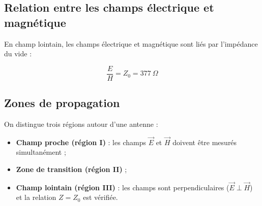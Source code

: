 \documentclass[12pt,a4paper]{article}
\begin{document}

\subsection{Relation entre les champs électrique et magnétique}

En champ lointain, les champs électrique et magnétique sont liés par l’impédance du vide :

\begin{equation}
\frac{E}{H} = Z_0 = 377 \ \Omega
\end{equation}

\subsection{Zones de propagation}

On distingue trois régions autour d’une antenne :

\begin{itemize}
    \item \textbf{Champ proche (région I)} : les champs $\vec{E}$ et $\vec{H}$ doivent être mesurés simultanément ;
    \item \textbf{Zone de transition (région II)} ;
    \item \textbf{Champ lointain (région III)} : les champs sont perpendiculaires ($\vec{E} \perp \vec{H}$) et la relation $Z = Z_0$ est vérifiée.
\end{itemize}


\end{document}
\end{itemize}
\end{document}

